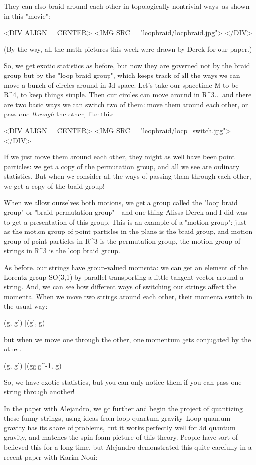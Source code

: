 They can also braid around each other in topologically nontrivial
ways, as shown in this "movie": 

<DIV ALIGN = CENTER>
<IMG SRC = "loopbraid/loopbraid.jpg">
</DIV>

(By the way, all the math pictures this week were drawn by 
Derek for our paper.)

So, we get exotic statistics as before, but now they are governed not by
the braid group but by the "loop braid group", which keeps
track of all the ways we can move a bunch of circles around in 3d
space.  Let's take our spacetime M to be R^{4}, to keep things simple.
Then our circles can move around in R^{3}... and there are 
two basic ways we can switch two of them: move them around each other, 
or pass one \emph{through} the other, like this:

<DIV ALIGN = CENTER>
<IMG SRC = "loopbraid/loop_switch.jpg">
</DIV>

If we just move them around each other, they might as well have been 
point particles: we get a copy of the permutation group, and all we see 
are ordinary statistics.  But when we consider all the ways of passing
them through each other, we get a copy of the braid group!  

When we allow ourselves both motions, we get a group called the
"loop braid group" or "braid permutation group" -
and one thing Alissa Derek and I did was to get a presentation of this
group.  This is an example of a "motion group": just as the
motion group of point particles in the plane is the braid group, and
motion group of point particles in R^{3} is the permutation group, the
motion group of strings in R^{3} is the loop braid group.

As before, our strings have group-valued momenta: we can get an 
element of the Lorentz group SO(3,1) by parallel transporting a
little tangent vector around a string.  And, we can see how 
different ways of switching our strings affect the momenta.  
When we move two strings around each other, their momenta switch
in the usual way:

(g, g') |\to  (g', g)

but when we move one through the other, one momentum gets conjugated
by the other:

(g, g') |\to  (gg'g^{-1}, g)

So, we have exotic statistics, but you can only notice them if you
can pass one string through another!

In the paper with Alejandro, we go further and begin the project of
quantizing these funny strings, using ideas from loop quantum gravity.
Loop quantum gravity has its share of problems, but it works perfectly
well for 3d quantum gravity, and matches the spin foam picture of this
theory.  People have sort of believed this for a long time, but 
Alejandro demonstrated this quite carefully in a recent paper with 
Karim Noui:

